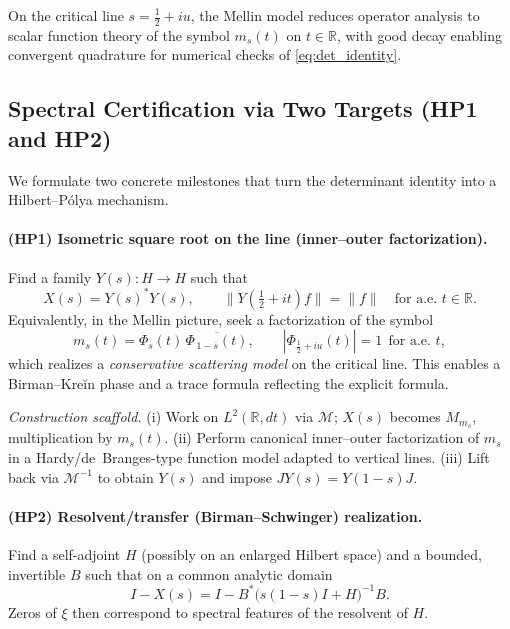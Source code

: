 \begin{remark}
On the critical line \(s=\tfrac12+iu\), the Mellin model reduces operator analysis to scalar function theory of the symbol \(m_s(t)\) on \(t\in\mathbb{R}\),
with good decay enabling convergent quadrature for numerical checks of \eqref{eq:det_identity}.
\end{remark}

\subsection{Spectral Certification via Two Targets (HP1 and HP2)}

We formulate two concrete milestones that turn the determinant identity into a Hilbert–Pólya mechanism.

\paragraph{(HP1) Isometric square root on the line (inner–outer factorization).}
Find a family \(Y(s):H\to H\) such that
\begin{equation}
X(s)=Y(s)^{*}Y(s),
\qquad
\|Y(\tfrac12+it)f\|=\|f\|\quad\text{for a.e. }t\in\mathbb{R}.
\end{equation}
Equivalently, in the Mellin picture, seek a factorization of the symbol
\begin{equation}
m_s(t)=\Phi_s(t)\,\overline{\Phi_{\,1-\overline{s}}(t)},
\qquad
|\Phi_{\frac12+iu}(t)|=1\ \ \text{for a.e. }t,
\end{equation}
which realizes a \emph{conservative scattering model} on the critical line. This enables a Birman–Kreĭn phase and a trace formula reflecting the explicit formula.

\emph{Construction scaffold.}
(i) Work on \(L^2(\mathbb{R},dt)\) via \(\mathcal{M}\); \(X(s)\) becomes \(M_{m_s}\), multiplication by \(m_s(t)\).
(ii) Perform canonical inner–outer factorization of \(m_s\) in a Hardy/de~Branges-type function model adapted to vertical lines.
(iii) Lift back via \(\mathcal{M}^{-1}\) to obtain \(Y(s)\) and impose \(JY(s)=Y(1-s)J\).

\paragraph{(HP2) Resolvent/transfer (Birman–Schwinger) realization.}
Find a self-adjoint \(H\) (possibly on an enlarged Hilbert space) and a bounded, invertible \(B\) such that on a common analytic domain
\begin{equation}
\boxed{\quad I-X(s)=I- B^{*}\big(s(1-s)I+H\big)^{-1}B.\quad}
\end{equation}
Zeros of \(\xi\) then correspond to spectral features of the resolvent of \(H\).

